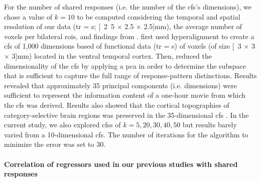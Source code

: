 %
%

For the number of shared responses (i.e. the number of the \ac{cfs}'s
dimensions), we chose a value of $k=10$ to be computed considering the temporal
and spatial resolution of our data (\ac{tr} = \unit[2]{s}; \unit[2.5 $\times$
2.5 $\times$ 2.5]{mm}), the average number of voxels per bilateral \acp{roi},
and findings from \citet{haxby2011common}.
%
\citet{haxby2011common} first used hyperalignment to create a \ac{cfs} of 1,000
dimensions based of functional data (\ac{tr} = \unit[3]{s}) of voxels (of size
\unit[3 $\times$ 3 $\times$ 3]{mm}) located in the ventral temporal cortex.
%
Then, \citet{haxby2011common} reduced the dimensionality of the \ac{cfs} by
applying a \ac{pca} in order to determine the subspace that is sufficient to
capture the full range of response-pattern distinctions.
%
Results revealed that approximately 35 principal components (i.e. dimensions)
were sufficient to represent the information content of a one-hour movie from
which the \ac{cfs} was derived.
%
Results also showed that the cortical topographies of category-selective brain
regions was preserved in the 35-dimensional \ac{cfs} \citep{haxby2011common}.
%
In the current study, we also explored \acp{cfs} of $k=5, 20, 30, 40, 50$ but
results barely varied from a 10-dimensional \ac{cfs}.
The number of iterations for the algorithm to minimize the error was set to 30.



\paragraph{Correlation of regressors used in our previous studies with shared
responses}

